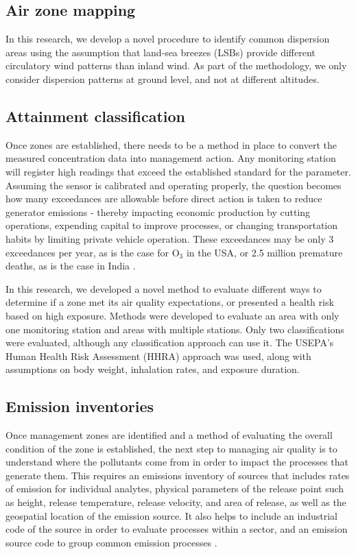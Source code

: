 \subsection{Air zone mapping}

In this research, we develop a novel procedure to identify common dispersion areas using the assumption that land-sea breezes (LSBs) provide different circulatory wind patterns than inland wind. As part of the methodology, we only consider dispersion patterns at ground level, and not at different altitudes.

\subsection{Attainment classification}
Once zones are established, there needs to be a method in place to convert the measured concentration data into management action. Any monitoring station will register high readings that exceed the established standard for the parameter. Assuming the sensor is calibrated and operating properly, the question becomes how many exceedances are allowable before direct action is taken to reduce generator emissions - thereby impacting economic production by cutting operations, expending capital to improve processes, or changing transportation habits by limiting private vehicle operation. These exceedances may be only 3 exceedances per year, as is the case for O$_{3}$ in the USA, or 2.5 million premature deaths, as is the case in India \citep{Landrigan2017}.

In this research, we developed a novel method to evaluate different ways to determine if a zone met its air quality expectations, or presented a health risk based on high exposure. Methods were developed to evaluate an area with only one monitoring station and areas with multiple stations. Only two classifications were evaluated, although any classification approach can use it. The USEPA's Human Health Risk Assessment (HHRA) approach was used, along with assumptions on body weight, inhalation rates, and exposure duration. 

\subsection{Emission inventories}
Once management zones are identified and a method of evaluating the overall condition of the zone is established, the next step to managing air quality is to understand where the pollutants come from in order to impact the processes that generate them. This requires an emissions inventory of sources that includes rates of emission for individual analytes, physical parameters of the release point such as height, release temperature, release velocity, and area of release, as well as the geospatial location of the emission source. It also helps to include an industrial code of the source in order to evaluate processes within a sector, and an emission source code to group common emission processes \citep{The2008}.

